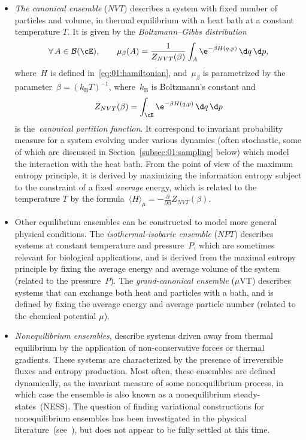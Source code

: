 \begin{itemize}
    \item{\textit{The canonical ensemble} ($NVT$) describes a system with fixed number of particles and volume, in thermal equilibrium with a heat bath at a constant temperature $T$. It is given by the \textit{Boltzmann--Gibbs distribution}
    \begin{equation}
        \label{eq:01:boltzmann_gibbs}
        \forall\,A\in\mathcal B(\cE),\qquad \mu_\beta(A) = \frac{1}{Z_{NVT}(\beta)}\int_{A}\e^{-\beta H(q,p)}\,\d q\,\d p,
    \end{equation}
    where~$H$ is defined in~\eqref{eq:01:hamiltonian}, and~$\mu_\beta$ is parametrized by the parameter~$\beta = (k_{\mathrm{B}}T)^{-1}$, where~$k_{\mathrm{B}}$ is Boltzmann's constant and
    \[
    Z_{NVT}(\beta) = \int_{\cE}\e^{-\beta H(q,p)}\,\d q\,\d p
    \]
    is the~\textit{canonical partition function}.
    It correspond to invariant probability measure for a system evolving under various dynamics (often stochastic, some of which are discussed in Section~\ref{subsec:01:sampling} below) which model the interaction with the heat bath. From the point of view of the maximum entropy principle, it is derived by maximizing the information entropy subject to the constraint of a fixed \textit{average} energy, which is related to the temperature $T$ by the formula~${\langle H\rangle_\mu = -\frac{\partial}{\partial\beta}Z_{NVT}(\beta)}$. }
    \item{Other equilibrium ensembles can be constructed to model more general physical conditions. The \textit{isothermal-isobaric ensemble} ($NPT$) describes systems at constant temperature and pressure~$P$, which are sometimes relevant for biological applications, and is derived from the maximal entropy principle by fixing the average energy and average volume of the system (related to the pressure~$P$). The \textit{grand-canonical ensemble} ($\mu$VT) describes systems that can exchange both heat and particles with a bath, and is defined by fixing the average energy and average particle number (related to the chemical potential $\mu$).}
    \item{\textit{Nonequilibrium ensembles}, describe systems driven away from thermal equilibrium by the application of non-conservative forces or thermal gradients. These systems are characterized by the presence of irreversible fluxes and entropy production. Most often, these ensembles are defined dynamically, as the invariant measure of some nonequilibrium process, in which case the ensemble is also known as a nonequilibrium steady-states~(NESS). The question of finding variational constructions for nonequilibrium ensembles has been investigated in the physical literature~(see~\cite{J80}), but does not appear to be fully settled at this time.}
\end{itemize}
